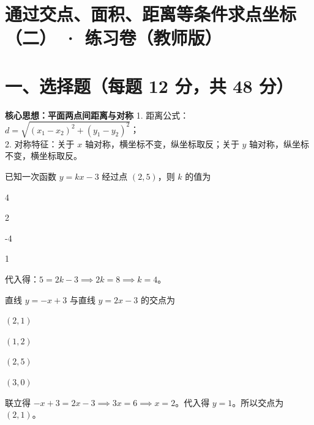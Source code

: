 \documentclass{exam-zh}
\begin{document}
\section*{通过交点、面积、距离等条件求点坐标（二） · 练习卷（教师版）}

\section*{一、选择题（每题 12 分，共 48 分）}


\begin{keyideabox}
  \textbf{核心思想：平面两点间距离与对称}
  1. 距离公式：$d = \sqrt{(x_1-x_2)^2 + (y_1-y_2)^2}$；\\ 2. 对称特征：关于 $x$ 轴对称，横坐标不变，纵坐标取反；关于 $y$ 轴对称，纵坐标不变，横坐标取反。
\end{keyideabox}



\begin{question}[points=12]
  已知一次函数 $y = kx - 3$ 经过点 $(2, 5)$，则 $k$ 的值为
  \begin{choices}
    \item 4
    \item 2
    \item -4
    \item 1
  \end{choices}
  \paren[A]
  \begin{solutionblock}
    代入得：$5 = 2k - 3 \implies 2k = 8 \implies k = 4$。
  \end{solutionblock}
\end{question}



\begin{question}[points=12]
  直线 $y = -x + 3$ 与直线 $y = 2x - 3$ 的交点为
  \begin{choices}
    \item $(2, 1)$
    \item $(1, 2)$
    \item $(2, 5)$
    \item $(3, 0)$
  \end{choices}
  \paren[A]
  \begin{solutionblock}
    联立得 $-x + 3 = 2x - 3 \implies 3x = 6 \implies x = 2$。代入得 $y = 1$。所以交点为 $(2, 1)$。
  \end{solutionblock}
\end{question}
\end{document}
